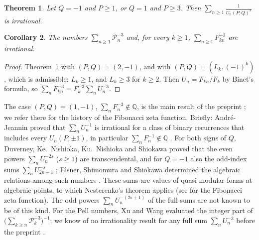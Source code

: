 \documentclass[11pt]{amsart}
\newtheorem{theorem}{Theorem}[section]
\newtheorem{corollary}[theorem]{Corollary}
\theoremstyle{definition}
\theoremstyle{remark}
\numberwithin{equation}{section}
\newcommand{\QQ}{\mathbb{Q}}
\newcommand{\cP}{\mathcal{P}}
\begin{document}
\begin{theorem}\label{thm:main}
Let $Q=-1$ and $P\ge1$, or $Q=1$ and $P\ge3$. Then $\displaystyle\sum_{n\ge1}\frac1{U_n(P,Q)^3}$ is irrational.
\end{theorem}

\begin{corollary}\label{cor:main}
The numbers $\sum_{n\ge1}\cP_n^{-3}$ and, for every $k\ge1$, $\sum_{n\ge1}F_{kn}^{-3}$ are irrational.
\end{corollary}

\begin{proof}
Theorem~\ref{thm:main} with $(P,Q)=(2,-1)$, and with $(P,Q)=(L_k,(-1)^k)$, which is admissible: $L_k\ge1$, and $L_k\ge3$
for $k\ge2$. Then $U_n=F_{kn}/F_k$ by Binet's formula, so $\sum_nF_{kn}^{-3}=F_k^{-3}\sum_nU_n^{-3}$.
\end{proof}

The case $(P,Q)=(1,-1)$, $\sum_nF_n^{-3}\notin\QQ$, is the main result of the preprint \cite{Kri26}; we refer there
for the history of the Fibonacci zeta function. Briefly: Andr\'e-Jeannin proved that $\sum_nU_n^{-1}$ is irrational for a
class of binary recurrences that includes every $U_n(P,\pm1)$, in particular $\sum_nF_n^{-1}\notin\QQ$ \cite{AJ89}. For
both signs of $Q$, Duverney, Ke.~Nishioka, Ku.~Nishioka and Shiokawa proved that the even powers $\sum_nU_n^{-2s}$
($s\ge1$) are transcendental, and for $Q=-1$ also the odd-index sums $\sum_nU_{2n-1}^{-s}$ \cite{DNNS97}; Elsner,
Shimomura and Shiokawa determined the algebraic relations among such numbers \cite{ESS07,ESS08,ESS12}. These sums are
values of quasi-modular forms at algebraic points, to which Nesterenko's theorem \cite{Nes96} applies (see
\cite[\S3.4]{Wal10} for the Fibonacci zeta function). The odd powers $\sum_nU_n^{-(2s+1)}$ of the full sums are not
known to be of this kind. For the Pell numbers, Xu and Wang \cite{XW13} evaluated the integer part of
$\bigl(\sum_{k\ge n}\cP_k^{-3}\bigr)^{-1}$; we know of no irrationality result for any full sum $\sum_nU_n^{-3}$ before
the preprint \cite{Kri26}.
\end{document}
